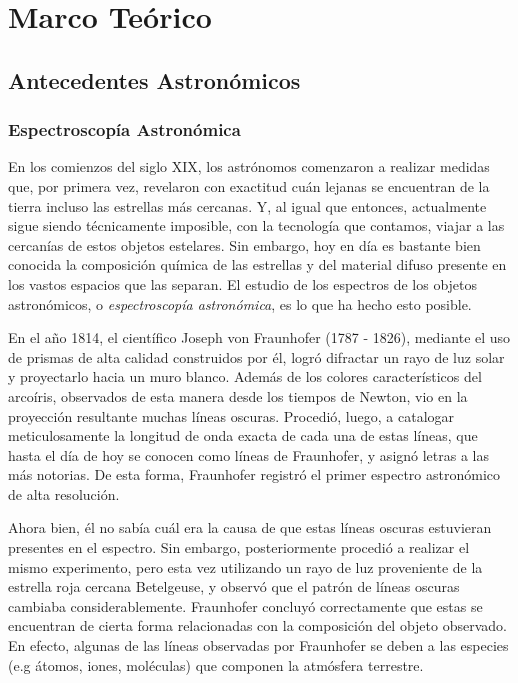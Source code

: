 \chapter{Marco Teórico}


\section{Antecedentes Astronómicos}

\subsection{Espectroscopía Astronómica}

En los comienzos del siglo XIX, los astrónomos comenzaron a realizar medidas que, por primera vez, revelaron con exactitud cuán lejanas se encuentran de la tierra incluso las estrellas más cercanas. Y, al igual que entonces, actualmente sigue siendo técnicamente imposible, con la tecnología que contamos, viajar a las cercanías de estos objetos estelares. Sin embargo, hoy en día es bastante bien conocida la composición química de las estrellas y del material difuso presente en los vastos espacios que las separan. El estudio de los espectros de los objetos astronómicos, o \emph{espectroscopía astronómica}, es lo que ha hecho esto posible.

En el año 1814, el científico Joseph von Fraunhofer (1787 - 1826), mediante el uso de prismas de alta calidad construidos por él, logró difractar un rayo de luz solar y proyectarlo hacia un muro blanco. Además de los colores característicos del arcoíris, observados de esta manera desde los tiempos de Newton, vio en la proyección resultante muchas líneas oscuras. Procedió, luego, a catalogar meticulosamente la longitud de onda exacta de cada una de estas líneas, que hasta el día de hoy se conocen como líneas de Fraunhofer, y asignó letras a las más notorias. De esta forma, Fraunhofer registró el primer espectro astronómico de alta resolución.

Ahora bien, él no sabía cuál era la causa de que estas líneas oscuras estuvieran presentes en el espectro. Sin embargo, posteriormente procedió a realizar el mismo experimento, pero esta vez utilizando un rayo de luz proveniente de la estrella roja cercana Betelgeuse, y observó que el patrón de líneas oscuras cambiaba considerablemente. Fraunhofer concluyó correctamente que estas se encuentran de cierta forma relacionadas con la composición del objeto observado. En efecto, algunas de las líneas observadas por Fraunhofer se deben a las especies (e.g átomos, iones, moléculas) que componen la atmósfera terrestre.

